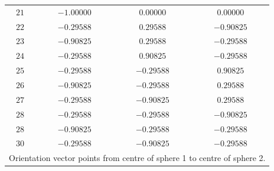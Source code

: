 \documentclass[final, 3p]{elsarticle}
\begin{document}
\begin{table}[h]
\begin{center}
\begin{tabular}{|c|c|c|c|}
$21$ & $-1.00000$ &  $ 0.00000$ & $ 0.00000$ \\
$22$ & $-0.29588$ &  $ 0.29588$ & $-0.90825$ \\
$23$ & $-0.90825$ &  $ 0.29588$ & $-0.29588$ \\
$24$ & $-0.29588$ &  $ 0.90825$ & $-0.29588$ \\
$25$ & $-0.29588$ &  $-0.29588$ & $ 0.90825$ \\
$26$ & $-0.90825$ &  $-0.29588$ & $ 0.29588$ \\
$27$ & $-0.29588$ &  $-0.90825$ & $ 0.29588$ \\
$28$ & $-0.29588$ &  $-0.29588$ & $-0.90825$ \\
$28$ & $-0.90825$ &  $-0.29588$ & $-0.29588$ \\
$30$ & $-0.29588$ &  $-0.90825$ & $-0.29588$ \\
\hline\hline
\multicolumn{4}{l}{\small *Orientation vector points from centre of sphere 1 to centre of sphere 2.} \\
		\end{tabular}
	\end{center}
\end{table}
\end{document}
